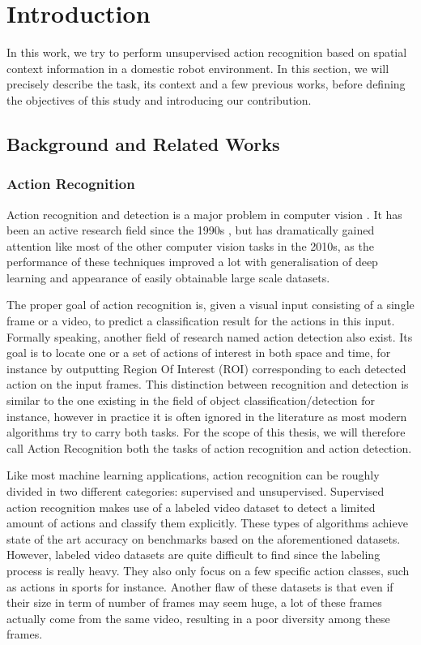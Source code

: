 \chapter{Introduction}

In this work, we try to perform unsupervised action recognition based on spatial context information in a domestic robot environment. In this section, we will precisely describe the task, its context and a few previous works, before defining the objectives of this study and introducing our contribution.

\section{Background and Related Works}
\subsection{Action Recognition}
Action recognition and detection is a major problem in computer vision \cite{review_action_recognition}. It has been an active research field since the 1990s \cite{plan_recognition}, but has dramatically gained attention like most of the other computer vision tasks in the 2010s, as the performance of these techniques improved a lot with generalisation of deep learning and appearance of easily obtainable large scale datasets.

The proper goal of action recognition is, given a visual input consisting of a single frame or a video, to predict a classification result for the actions in this input. Formally speaking, another field of research named action detection also exist. Its goal is to locate one or a set of actions of interest in both space and time, for instance by outputting Region Of Interest (ROI) corresponding to each detected action on the input frames.
This distinction between recognition and detection is similar to the one existing in the field of object classification/detection for instance, however in practice it is often ignored in the literature as most modern algorithms try to carry both tasks. For the scope of this thesis, we will therefore call Action Recognition both the tasks of action recognition and action detection.

Like most machine learning applications, action recognition can be roughly divided in two different categories: supervised and unsupervised. Supervised action recognition makes use of a labeled video dataset \cite{hollywood2,sports_video_dataset,ActivityNet} to detect a limited amount of actions and classify them explicitly. These types of algorithms achieve state of the art accuracy on benchmarks based on the aforementioned datasets. However, labeled video datasets are quite difficult to find since the labeling process is really heavy. They also only focus on a few specific action classes, such as actions in sports for instance. Another flaw of these datasets is that even if their size in term of number of frames may seem huge, a lot of these frames actually come from the same video, resulting in a poor diversity among these frames.

